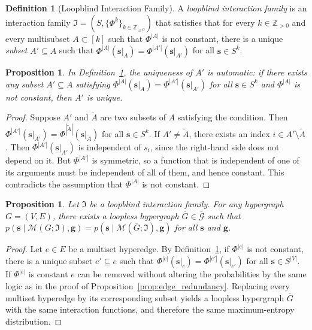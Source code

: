 \documentclass[11pt,reqno]{amsart}
\newcommand{\vecs}{\boldsymbol{s}}
\newcommand{\vecg}{\boldsymbol{g}}
\newcommand{\Mo}{\mathcal{M}}
\newcommand{\IFam}{\mathfrak{I}}
\theoremstyle{plain}
\newtheorem{proposition}[theorem]{Proposition}
\theoremstyle{definition}
\newtheorem{definition}[theorem]{Definition}
\numberwithin{equation}{section}
\begin{document}
\begin{definition}[Loopblind Interaction Family]
    \label{def:loopless}
    A \emph{loopblind interaction family} is an interaction family $\IFam = (S, \{\Phi^k\}_{k \in \mathbb{Z}_{\geq 0}})$ that satisfies that for every $k \in \mathbb{Z}_{> 0}$ and every multisubset $A \subset [k]$ such that $\Phi^{|A|}$ is not constant, there is a unique \emph{subset} $A' \subseteq A$ such that $\Phi^{|A|}(\vecs|_A) = \Phi^{|A'|}(\vecs|_{A'})$ for all $\vecs \in S^k$.
\end{definition}

\begin{proposition}
    \label{prop:loopless_uniqueness}
    In Definition~\ref{def:loopless}, the uniqueness of $A'$ is automatic: if there exists any subset $A' \subseteq A$ satisfying $\Phi^{|A|}(\vecs|_A) = \Phi^{|A'|}(\vecs|_{A'})$ for all $\vecs \in S^k$ and $\Phi^{|A|}$ is not constant, then $A'$ is unique.
\end{proposition}
\begin{proof}
    Suppose $A'$ and $\widetilde{A}$ are two subsets of $A$ satisfying the condition. Then $\Phi^{|A'|}(\vecs|_{A'}) = \Phi^{|\widetilde{A}|}(\vecs|_{\widetilde{A}})$ for all $\vecs \in S^k$. If $A' \neq \widetilde{A}$, there exists an index $i \in A' \setminus \widetilde{A}$. Then $\Phi^{|A'|}(\vecs|_{A'})$ is independent of $s_i$, since the right-hand side does not depend on it. But $\Phi^{|A'|}$ is symmetric, so a function that is independent of one of its arguments must be independent of all of them, and hence constant. This contradicts the assumption that $\Phi^{|A|}$ is not constant.
\end{proof}

\begin{proposition}
    \label{prop:loopless_reduction}
    Let $\IFam$ be a loopblind interaction family. For any hypergraph $G = (V,E)$, there exists a loopless hypergraph $\overline{G} \in \overline{\mathcal{G}}$ such that $p(\vecs \mid \Mo(G; \IFam), \vecg) = p(\vecs \mid \Mo(\overline{G}; \IFam), \vecg)$ for all $\vecs$ and $\vecg$.
\end{proposition}
\begin{proof}
    Let $e \in E$ be a multiset hyperedge. By Definition~\ref{def:loopless}, if $\Phi^{|e|}$ is not constant, there is a unique subset $e' \subseteq e$ such that $\Phi^{|e|}(\vecs|_e) = \Phi^{|e'|}(\vecs|_{e'})$ for all $\vecs \in S^{|V|}$. If $\Phi^{|e|}$ is constant $e$ can be removed without altering the probabilities by the same logic as in the proof of Proposition~\ref{prop:edge_redundancy}. Replacing every multiset hyperedge by its corresponding subset yields a loopless hypergraph $\overline{G}$ with the same interaction functions, and therefore the same maximum-entropy distribution.
\end{proof}
\end{document}
